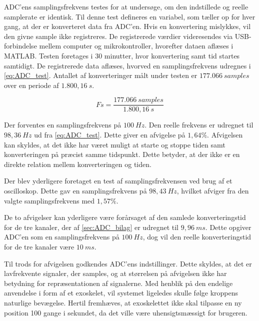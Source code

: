 ADC'ens samplingsfrekvens testes for at undersøge, om den indstillede og reelle samplerate er identisk. 
Til denne test defineres en variabel, som tæller op for hver gang, at der er konverteret data fra ADC'en. 
Hvis en konvertering mislykkes, vil den givne sample ikke registreres. 
De registrerede værdier videresendes via USB-forbindelse mellem computer og mikrokontroller, hvorefter dataen aflæses i MATLAB. 
Testen foretages i 30 minutter, hvor konvertering samt tid startes samtidigt. 
De registrerede data aflæses, hvorved en samplingsfrekvens udregnes i \autoref{eq:ADC_test}. 
Antallet af konverteringer målt under testen er $177.066~samples$ over en periode af $1.800,16~s$.

\begin{equation}\label{eq:ADC_test}
Fs = \frac{177.066~samples}{1.800,16~s}
\end{equation}

\noindent
Der forventes en samplingsfrekvens på $100~Hz$. 
Den reelle frekvens er udregnet til $98,36~Hz$ ud fra \autoref{eq:ADC_test}. 
Dette giver en afvigelse på $1,64\%$. 
Afvigelsen kan skyldes, at det ikke har været muligt at starte og stoppe tiden samt konverteringen på præcist samme tidspunkt. 
Dette betyder, at der ikke er en direkte relation mellem konverteringen og tiden. 

Der blev yderligere foretaget en test af samplingsfrekvensen ved brug af et oscilloskop. 
Dette gav en samplingsfrekvens på $98,43~Hz$, hvilket afviger fra den valgte samplingsfrekvens med $1,57\%$. 

De to afvigelser kan yderligere være forårsaget  af den samlede konverteringstid for de tre kanaler, der af \autoref{sec:ADC_bilag} er udregnet til $9,96~ms$. 
Dette opgiver ADC'en som en samplingsfrekvens på $100~Hz$, dog vil den reelle konverteringstid for de tre kanaler være $10~ms$.  


Til trods for afvigelsen godkendes ADC'ens indstillinger. 
Dette skyldes, at det er lavfrekvente signaler, der samples, og at størrelsen på afvigelsen ikke har betydning for repræsentationen af signalerne. 
Med henblik på den endelige anvendelse i form af et exoskelet, vil systemet ligeledes skulle følge kroppens naturlige bevægelse. 
Hertil fremhæves, at exoskelettet ikke skal tilpasse en ny position 100 gange i sekundet, da det ville være uhensigtsmæssigt for brugeren.


